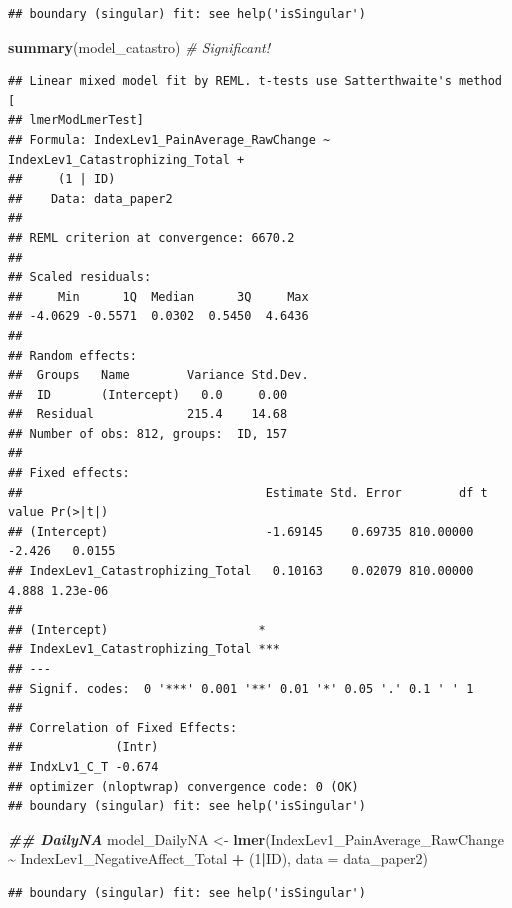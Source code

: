 \documentclass[
  12pt,
]{article}
\newenvironment{Shaded}{\begin{snugshade}}{\end{snugshade}}
\newcommand{\AttributeTok}[1]{\textcolor[rgb]{0.13,0.29,0.53}{#1}}
\newcommand{\CommentTok}[1]{\textcolor[rgb]{0.56,0.35,0.01}{\textit{#1}}}
\newcommand{\DecValTok}[1]{\textcolor[rgb]{0.00,0.00,0.81}{#1}}
\newcommand{\DocumentationTok}[1]{\textcolor[rgb]{0.56,0.35,0.01}{\textbf{\textit{#1}}}}
\newcommand{\FunctionTok}[1]{\textcolor[rgb]{0.13,0.29,0.53}{\textbf{#1}}}
\newcommand{\NormalTok}[1]{#1}
\newcommand{\OtherTok}[1]{\textcolor[rgb]{0.56,0.35,0.01}{#1}}
\newcommand{\SpecialCharTok}[1]{\textcolor[rgb]{0.81,0.36,0.00}{\textbf{#1}}}
\begin{document}
\begin{verbatim}
## boundary (singular) fit: see help('isSingular')
\end{verbatim}

\begin{Shaded}
\begin{Highlighting}[]
\FunctionTok{summary}\NormalTok{(model\_catastro) }\CommentTok{\# Significant!}
\end{Highlighting}
\end{Shaded}

\begin{verbatim}
## Linear mixed model fit by REML. t-tests use Satterthwaite's method [
## lmerModLmerTest]
## Formula: IndexLev1_PainAverage_RawChange ~ IndexLev1_Catastrophizing_Total +  
##     (1 | ID)
##    Data: data_paper2
## 
## REML criterion at convergence: 6670.2
## 
## Scaled residuals: 
##     Min      1Q  Median      3Q     Max 
## -4.0629 -0.5571  0.0302  0.5450  4.6436 
## 
## Random effects:
##  Groups   Name        Variance Std.Dev.
##  ID       (Intercept)   0.0     0.00   
##  Residual             215.4    14.68   
## Number of obs: 812, groups:  ID, 157
## 
## Fixed effects:
##                                  Estimate Std. Error        df t value Pr(>|t|)
## (Intercept)                      -1.69145    0.69735 810.00000  -2.426   0.0155
## IndexLev1_Catastrophizing_Total   0.10163    0.02079 810.00000   4.888 1.23e-06
##                                    
## (Intercept)                     *  
## IndexLev1_Catastrophizing_Total ***
## ---
## Signif. codes:  0 '***' 0.001 '**' 0.01 '*' 0.05 '.' 0.1 ' ' 1
## 
## Correlation of Fixed Effects:
##             (Intr)
## IndxLv1_C_T -0.674
## optimizer (nloptwrap) convergence code: 0 (OK)
## boundary (singular) fit: see help('isSingular')
\end{verbatim}

\begin{Shaded}
\begin{Highlighting}[]
\DocumentationTok{\#\# DailyNA}
\NormalTok{model\_DailyNA }\OtherTok{\textless{}{-}} \FunctionTok{lmer}\NormalTok{(IndexLev1\_PainAverage\_RawChange }\SpecialCharTok{\textasciitilde{}}\NormalTok{ IndexLev1\_NegativeAffect\_Total }\SpecialCharTok{+}\NormalTok{ (}\DecValTok{1}\SpecialCharTok{|}\NormalTok{ID), }\AttributeTok{data =}\NormalTok{ data\_paper2)}
\end{Highlighting}
\end{Shaded}

\begin{verbatim}
## boundary (singular) fit: see help('isSingular')
\end{verbatim}
\end{document}
